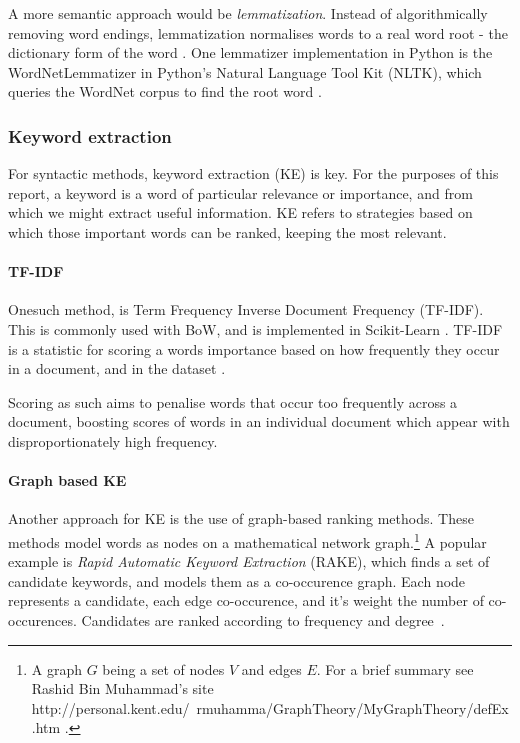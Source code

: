 A more semantic approach would be \emph{lemmatization}. Instead of algorithmically removing word endings, lemmatization 
normalises words to a real word root - the dictionary
form of the word \cite{Jayakodi2016}.  One lemmatizer implementation in Python is the WordNetLemmatizer in Python's
Natural Language Tool Kit (NLTK), which queries the WordNet corpus to find the root word 
\cite{StevenBirdEwanKlein2009, princetonuniversity_2010}. 
 
\subsubsection{Keyword extraction}\label{sssec:kwe}
For syntactic methods, keyword extraction (KE) is key.  For the purposes of this report, a keyword is a word of particular
relevance or importance, and from which we might extract useful information.  KE refers to strategies
based on which those important words can be ranked, keeping the most relevant.

\paragraph{TF-IDF}\label{ssec:tfidf}

Onesuch method, is Term Frequency Inverse Document Frequency (TF-IDF). This is commonly used with BoW, and is 
implemented in Scikit-Learn \cite{Barupal2011}.  TF-IDF is a statistic for scoring a words importance based on
how frequently they occur in a document, and in the dataset \cite{Ramos2003}.

Scoring as such aims to penalise words that occur too frequently across a document, boosting scores of words in an 
individual document which appear with disproportionately high frequency.

\paragraph{Graph based KE}\label{sssec:gbkwe}

Another approach for KE is the use of graph-based ranking methods.  These methods model words as
nodes on a mathematical network graph.\footnote{A graph $G$ being a set of nodes $V$ and edges $E$.  For a brief 
summary see Rashid Bin Muhammad's site http://personal.kent.edu/~rmuhamma/GraphTheory/MyGraphTheory/defEx.htm
\cite{muhammad}.}  A popular example is \emph{Rapid Automatic Keyword Extraction} (RAKE), which
finds a set of candidate keywords, and models them as a co-occurence graph.  
Each node represents a candidate, each edge co-occurence, and it's weight the number of co-occurences.  
Candidates are ranked according to frequency and degree~\cite{Rose2010}.

